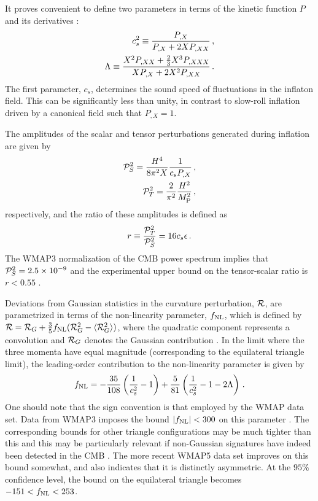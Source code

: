 It proves convenient to define two parameters in terms of the 
kinetic  function $P$ and its derivatives \cite{lidser1,lidser3}: 
\begin{eqnarray}
\label{defcs}
 c_s^2 \equiv \frac{P_{,X}}{P_{,X} + 2X P_{,XX}} \,,
\\
\label{deflambda}
\Lambda \equiv  \frac{X^2 P_{,XX} +
\frac{2}{3}X^3 P_{,XXX}}{X P_{,X} +
2X^2 P_{,XX}}\,.
\end{eqnarray}
The first parameter, $c_s$, determines the sound speed of fluctuations 
in the inflaton field. This can be significantly less than unity, 
in contrast to slow-roll inflation driven by a canonical 
field such that $P_{,X} =1$.

The amplitudes of the scalar and tensor perturbations 
generated during inflation are given by \cite{gm}
\begin{eqnarray} 
\label{eqn:Ps2}
 \mathcal{P}_S^2 = \frac{H^4}{8\pi^2 X}\frac{1}{c_s P_{,X}} \,,
\\
\label{eqn:Pt2}
\mathcal{P}_T^2 = \frac{2}{\pi^2} \frac{H^2}{M_{\rm P}^2} \,,
\end{eqnarray}
respectively, and the ratio of these amplitudes 
is defined as \cite{gm} 
\begin{equation}
\label{defr}
r\equiv \frac{\mathcal{P}_T^2}{\mathcal{P}_S^2} = 16c_s \epsilon \,.
\end{equation}  
The WMAP3 normalization of the CMB power spectrum 
implies that $\mathcal{P}_S^2= 2.5\times10^{-9}$ and 
the experimental upper bound on the tensor-scalar 
ratio is $r <0.55$ \cite{spergel}.

Deviations from Gaussian statistics in the curvature perturbation, ${\cal{R}}$,
are parametrized in terms of the non-linearity parameter, 
$f_{\mathrm{NL}}$, which is defined by ${\cal{R}} = {\cal{R}}_G + \frac{3}{5} f_{\mathrm{NL}}  (
{\cal{R}}_G^2 -\langle {\cal{R}}_G^2 \rangle )$, where the 
quadratic component represents a convolution and 
${\cal{R}}_G$ denotes the Gaussian contribution \cite{maldacena}. In the limit  
where the three momenta have equal magnitude (corresponding to the equilateral  
triangle limit), the leading-order contribution to the non-linearity 
parameter is given by \cite{chenetal,lidser3}
\begin{equation} 
\label{deffnl}
 f_{\mathrm{NL}} = -\frac{35}{108}\left(\frac{1}{c_s^2} -1 \right) +
\frac{5}{81}\left( \frac{1}{c_s^2} -1 -2\Lambda \right) \,.
 \end{equation} 
One should note that the sign convention is that employed
by the WMAP data set.
Data from WMAP3 imposes the bound $|f_{\mathrm{NL}}| < 300$ on this parameter
\cite{spergel}. The corresponding bounds for other triangle configurations 
may be much tighter than this and this may be particularly relevant if 
non-Gaussian signatures have indeed been detected in the 
CMB \cite{Yadav:2007yy,crim}. The more recent WMAP5 data set
\cite{Komatsu:2008hk} improves on this bound somewhat, and
also indicates that it is distinctly asymmetric. At the $95 \%$ confidence level, the bound on the 
equilateral triangle becomes $-151 < f_{\mathrm{NL}} < 253$.

